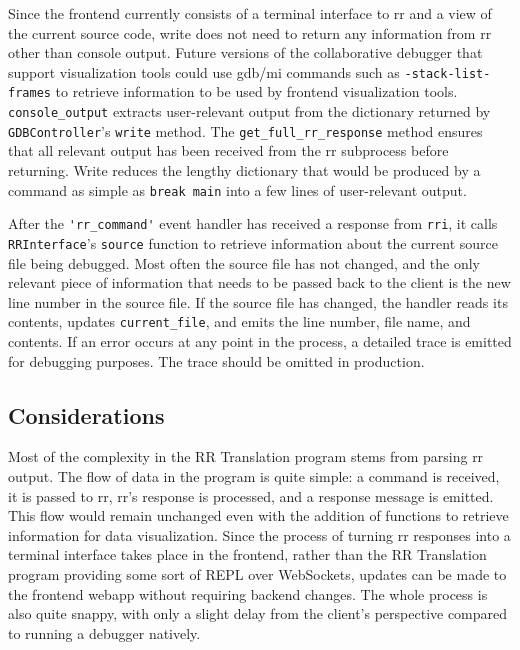 \documentclass[12pt]{article}
\begin{document}
Since the frontend currently consists of a terminal interface to rr
and a view of the current source code, write does not need to return
any information from rr other than console output.  Future versions of
the collaborative debugger that support visualization tools could use
gdb/mi commands such as \lstinline{-stack-list-frames} to retrieve
information to be used by frontend visualization tools.
\lstinline{console_output} extracts user-relevant output from the
dictionary returned by \lstinline{GDBController}'s \lstinline{write}
method.  The \lstinline{get_full_rr_response} method ensures that all
relevant output has been received from the rr subprocess before
returning.  Write reduces the lengthy dictionary that would be
produced by a command as simple as \lstinline{break main} into a few
lines of user-relevant output.
\par

After the \lstinline{'rr_command'} event handler has received a
response from \lstinline{rri}, it calls \lstinline{RRInterface}'s
\lstinline{source} function to retrieve information about the current
source file being debugged.  Most often the source file has not
changed, and the only relevant piece of information that needs to be
passed back to the client is the new line number in the source file.
If the source file has changed, the handler reads its contents,
updates \lstinline{current_file}, and emits the line number, file
name, and contents.  If an error occurs at any point in the process, a
detailed trace is emitted for debugging purposes.  The trace should
be omitted in production.
\par

\subsection{Considerations}

Most of the complexity in the RR Translation program stems from
parsing rr output.  The flow of data in the program is quite simple: a
command is received, it is passed to rr, rr's response is processed,
and a response message is emitted.  This flow would remain unchanged
even with the addition of functions to retrieve information for data
visualization.  Since the process of turning rr responses into a
terminal interface takes place in the frontend, rather than the RR
Translation program providing some sort of REPL over WebSockets,
updates can be made to the frontend webapp without requiring backend
changes.  The whole process is also quite snappy, with only a slight
delay from the client's perspective compared to running a debugger
natively.
\par
\end{document}
